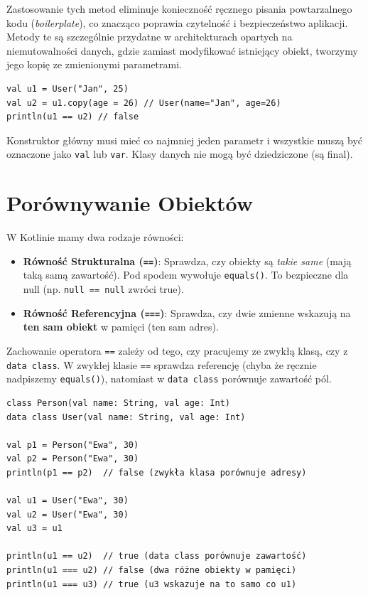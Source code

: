 Zastosowanie tych metod eliminuje konieczność ręcznego pisania powtarzalnego kodu (\textit{boilerplate}), co znacząco poprawia czytelność i bezpieczeństwo aplikacji. Metody te są szczególnie przydatne w architekturach opartych na niemutowalności danych, gdzie zamiast modyfikować istniejący obiekt, tworzymy jego kopię ze zmienionymi parametrami.

\begin{verbatim}
val u1 = User("Jan", 25)
val u2 = u1.copy(age = 26) // User(name="Jan", age=26)
println(u1 == u2) // false
\end{verbatim}

Konstruktor główny musi mieć co najmniej jeden parametr i wszystkie muszą być oznaczone jako \texttt{val} lub \texttt{var}. Klasy danych nie mogą być dziedziczone (są final).

\section{Porównywanie Obiektów}

W Kotlinie mamy dwa rodzaje równości:

\begin{itemize}
    \item \textbf{Równość Strukturalna (\texttt{==})}: Sprawdza, czy obiekty są \textit{takie same} (mają taką samą zawartość). Pod spodem wywołuje \texttt{equals()}. To bezpieczne dla null (np. \texttt{null == null} zwróci true).
    \item \textbf{Równość Referencyjna (\texttt{===})}: Sprawdza, czy dwie zmienne wskazują na \textbf{ten sam obiekt} w pamięci (ten sam adres).
\end{itemize}

Zachowanie operatora \texttt{==} zależy od tego, czy pracujemy ze zwykłą klasą, czy z \texttt{data class}. W zwykłej klasie \texttt{==} sprawdza referencję (chyba że ręcznie nadpiszemy \texttt{equals()}), natomiast w \texttt{data class} porównuje zawartość pól.

\begin{verbatim}
class Person(val name: String, val age: Int)
data class User(val name: String, val age: Int)

val p1 = Person("Ewa", 30)
val p2 = Person("Ewa", 30)
println(p1 == p2)  // false (zwykła klasa porównuje adresy)

val u1 = User("Ewa", 30)
val u2 = User("Ewa", 30)
val u3 = u1

println(u1 == u2)  // true (data class porównuje zawartość)
println(u1 === u2) // false (dwa różne obiekty w pamięci)
println(u1 === u3) // true (u3 wskazuje na to samo co u1)
\end{verbatim}

